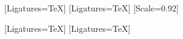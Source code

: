 \setmainfont{Noto Serif}[Ligatures=TeX]
\setsansfont{Inter}[Ligatures=TeX]
\setmonofont{DejaVu Sans Mono}[Scale=0.92]

\newfontfamily{}[Ligatures=TeX] %
\newfontfamily{}[Ligatures=TeX]           %

\newcommand{\capitular}[3]{%
  \lettrine[lines=3, findent=2pt, nindent=0pt]%
    {\tituloface\bfseries\textcolor{\cornivel{#1}}{#2}}{#3}}
